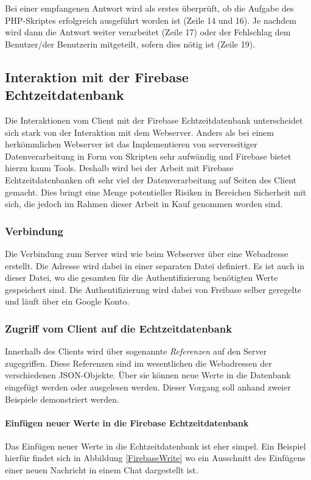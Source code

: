 \documentclass[../main.tex]{subfiles}
\begin{document}
	Bei einer empfangenen Antwort wird als erstes überprüft, ob die Aufgabe des PHP-Skriptes erfolgreich ausgeführt worden ist (Zeile 14 und 16). Je nachdem wird dann die Antwort weiter verarbeitet (Zeile 17) oder der Fehlschlag dem Benutzer/der Benutzerin mitgeteilt, sofern dies nötig ist (Zeile 19).
	
	\subsection{Interaktion mit der Firebase Echtzeitdatenbank}
	Die Interaktionen vom Client mit der Firebase Echtzeitdatenbank unterscheidet sich stark von der Interaktion mit dem Webserver. Anders als bei einem herkömmlichen Webserver ist das Implementieren von serverseitiger Datenverarbeitung in Form von Skripten sehr aufwändig und Firebase bietet hierzu kaum Tools. Deshalb wird bei der Arbeit mit Firebase Echtzeitdatenbanken oft sehr viel der Datenverarbeitung auf Seiten des Client gemacht. Dies bringt eine Menge potentieller Risiken in Bereichen Sicherheit mit sich, die jedoch im Rahmen dieser Arbeit in Kauf genommen worden sind. 
	
	\subsubsection{Verbindung}
	Die Verbindung zum Server wird wie beim Webserver über eine Webadresse erstellt. Die Adresse wird dabei in einer separaten Datei definiert. Es ist auch in dieser Datei, wo die gesamten für die Authentifizierung benötigten Werte gespeichert sind. Die Authentifizierung wird dabei von Freibase selber geregelte und läuft über ein Google Konto.
	
	\subsubsection{Zugriff vom Client auf die Echtzeitdatenbank}
	Innerhalb des Clients wird über sogenannte \emph{Referenzen} auf den Server zugegriffen. Diese Referenzen sind im wesentlichen die Webadressen der verschiedenen JSON-Objekte. Über sie können neue Werte in die Datenbank eingefügt werden oder ausgelesen werden. Dieser Vorgang soll anhand zweier Beispiele demonstriert werden.
	
	\paragraph{Einfügen neuer Werte in die Firebase Echtzeitdatenbank}
	Das Einfügen neuer Werte in die Echtzeitdatenbank ist eher simpel. Ein Beispiel hierfür findet sich in Abbildung \ref{FirebaseWrite} wo ein Ausschnitt des Einfügens einer neuen Nachricht in einem Chat dargestellt ist.
\end{document}
